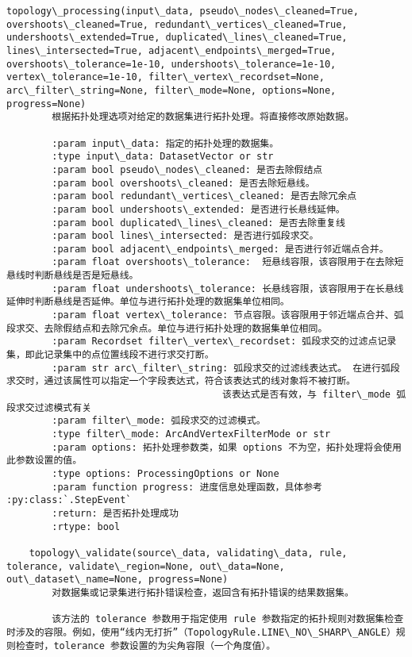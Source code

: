 \documentclass[11pt]{article}
\begin{document}
\begin{Verbatim}[commandchars=\\\{\}]
    topology\_processing(input\_data, pseudo\_nodes\_cleaned=True, overshoots\_cleaned=True, redundant\_vertices\_cleaned=True, undershoots\_extended=True, duplicated\_lines\_cleaned=True, lines\_intersected=True, adjacent\_endpoints\_merged=True, overshoots\_tolerance=1e-10, undershoots\_tolerance=1e-10, vertex\_tolerance=1e-10, filter\_vertex\_recordset=None, arc\_filter\_string=None, filter\_mode=None, options=None, progress=None)
        根据拓扑处理选项对给定的数据集进行拓扑处理。将直接修改原始数据。
        
        :param input\_data: 指定的拓扑处理的数据集。
        :type input\_data: DatasetVector or str
        :param bool pseudo\_nodes\_cleaned: 是否去除假结点
        :param bool overshoots\_cleaned: 是否去除短悬线。
        :param bool redundant\_vertices\_cleaned: 是否去除冗余点
        :param bool undershoots\_extended: 是否进行长悬线延伸。
        :param bool duplicated\_lines\_cleaned: 是否去除重复线
        :param bool lines\_intersected: 是否进行弧段求交。
        :param bool adjacent\_endpoints\_merged: 是否进行邻近端点合并。
        :param float overshoots\_tolerance:  短悬线容限，该容限用于在去除短悬线时判断悬线是否是短悬线。
        :param float undershoots\_tolerance: 长悬线容限，该容限用于在长悬线延伸时判断悬线是否延伸。单位与进行拓扑处理的数据集单位相同。
        :param float vertex\_tolerance: 节点容限。该容限用于邻近端点合并、弧段求交、去除假结点和去除冗余点。单位与进行拓扑处理的数据集单位相同。
        :param Recordset filter\_vertex\_recordset: 弧段求交的过滤点记录集，即此记录集中的点位置线段不进行求交打断。
        :param str arc\_filter\_string: 弧段求交的过滤线表达式。 在进行弧段求交时，通过该属性可以指定一个字段表达式，符合该表达式的线对象将不被打断。
                                      该表达式是否有效，与 filter\_mode 弧段求交过滤模式有关
        :param filter\_mode: 弧段求交的过滤模式。
        :type filter\_mode: ArcAndVertexFilterMode or str
        :param options: 拓扑处理参数类，如果 options 不为空，拓扑处理将会使用此参数设置的值。
        :type options: ProcessingOptions or None
        :param function progress: 进度信息处理函数，具体参考 :py:class:`.StepEvent`
        :return: 是否拓扑处理成功
        :rtype: bool
    
    topology\_validate(source\_data, validating\_data, rule, tolerance, validate\_region=None, out\_data=None, out\_dataset\_name=None, progress=None)
        对数据集或记录集进行拓扑错误检查，返回含有拓扑错误的结果数据集。
        
        该方法的 tolerance 参数用于指定使用 rule 参数指定的拓扑规则对数据集检查时涉及的容限。例如，使用“线内无打折”（TopologyRule.LINE\_NO\_SHARP\_ANGLE）规则检查时，tolerance 参数设置的为尖角容限（一个角度值）。
        

\end{Verbatim}
\end{document}
